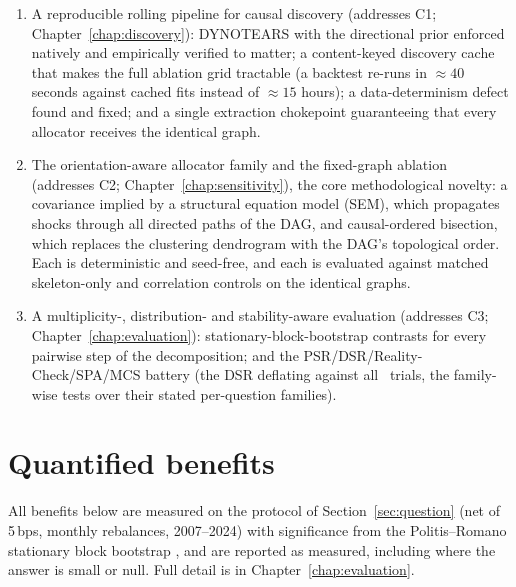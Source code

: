 \begin{enumerate}[label=A\arabic*, itemsep=2pt, topsep=3pt]
  \item A reproducible rolling pipeline for causal discovery
    (addresses C1; Chapter~\ref{chap:discovery}): DYNOTEARS with the directional prior
    enforced natively and empirically verified to matter; a content-keyed
    discovery cache that makes the full ablation grid tractable
    (a backtest re-runs in ${\approx}40$ seconds against cached fits
    instead of ${\approx}15$ hours); a data-determinism defect found
    and fixed; and a single extraction chokepoint guaranteeing that every
    allocator receives the identical graph.
  \item The orientation-aware allocator family and the fixed-graph
    ablation (addresses C2; Chapter~\ref{chap:sensitivity}), the core
    methodological novelty: a covariance implied by a structural equation
    model (SEM), which propagates shocks through all directed paths of the
    DAG, and
    causal-ordered bisection, which replaces the clustering
    dendrogram with the DAG's topological order. Each is deterministic and
    seed-free, and each is evaluated against matched skeleton-only and
    correlation controls on the identical graphs.
  \item A multiplicity-, distribution- and stability-aware evaluation
    (addresses C3; Chapter~\ref{chap:evaluation}): stationary-block-bootstrap
    contrasts for every pairwise step of the decomposition; and the
    PSR/DSR/Reality-Check/SPA/MCS battery (the DSR deflating against all
    \rsNtrials\ trials, the family-wise tests over their stated
    per-question families).
\end{enumerate}

\section{Quantified benefits}
\label{sec:benefits}

All benefits below are measured on the protocol of
Section~\ref{sec:question} (net of 5\,bps, monthly rebalances, 2007--2024)
with significance from the Politis--Romano stationary block bootstrap
\cite{politis1994stationary}, and are reported as measured, including
where the answer is small or null. Full detail is in
Chapter~\ref{chap:evaluation}.

